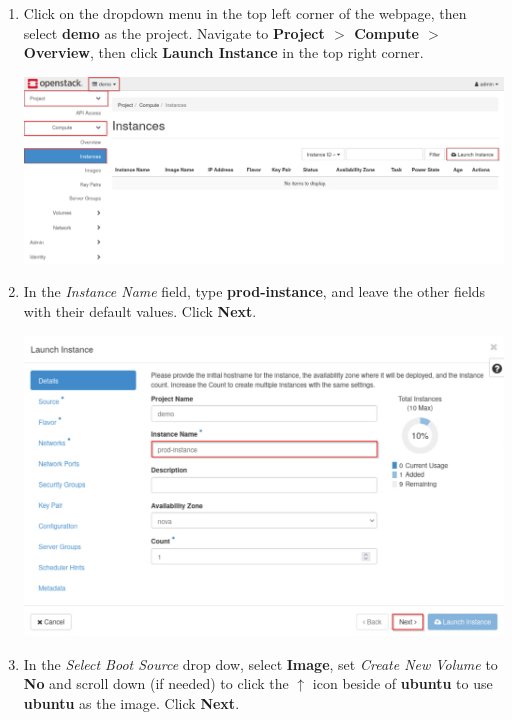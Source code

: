 \documentclass[letterpaper, 12pt]{article}
\begin{document}
\begin{enumerate}
    \item Click on the dropdown menu in the top left corner of the webpage, then select \textbf{demo} as the project.
    Navigate to \textbf{Project $>$ Compute $>$ Overview}, then click \textbf{Launch Instance} in the top right corner.

    \begin{center}
        \includegraphics[width=\linewidth]{images/part1/step5.png}
    \end{center}

    \item In the \textit{Instance Name} field, type \textbf{prod-instance}, and leave the other fields with their
    default values. Click \textbf{Next}.

    \begin{center}
        \includegraphics[width=\linewidth]{images/part1/step6.png}
    \end{center}

    \item In the \textit{Select Boot Source} drop dow, select \textbf{Image}, set \textit{Create New Volume} to
    \textbf{No} and scroll down (if needed) to click the $\uparrow$ icon beside of \textbf{ubuntu} to use
    \textbf{ubuntu} as the image. Click \textbf{Next}.


\end{enumerate}
\end{document}
